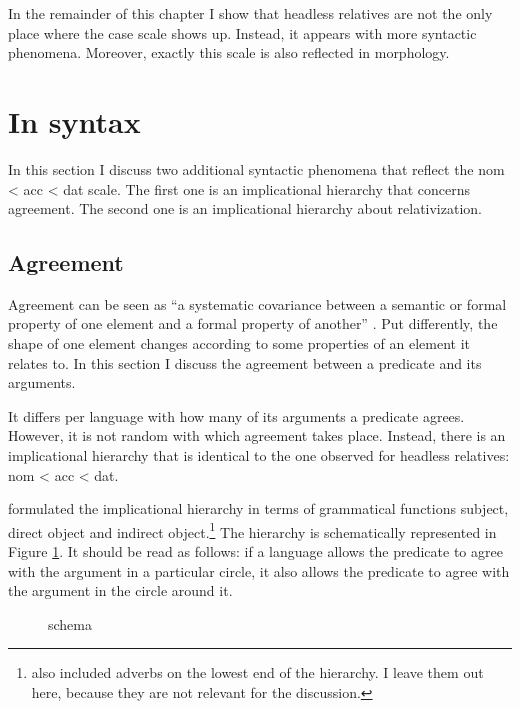 In the remainder of this chapter I show that headless relatives are not the only place where the case scale shows up. Instead, it appears with more syntactic phenomena. Moreover, exactly this scale is also reflected in morphology.


\section{In syntax}\label{sec:impl-hier}

In this section I discuss two additional syntactic phenomena that reflect the \ac{nom} < \ac{acc} < \ac{dat} scale. The first one is an implicational hierarchy that concerns agreement. The second one is an implicational hierarchy about relativization.


\subsection{Agreement}

Agreement can be seen as ``a systematic covariance between a semantic or formal property of one element and a formal property of another'' \citep{steel1978}. Put differently, the shape of one element changes according to some properties of an element it relates to. In this section I discuss the agreement between a predicate and its arguments.

It differs per language with how many of its arguments a predicate agrees. However, it is not random with which agreement takes place. Instead, there is an implicational hierarchy that is identical to the one observed for headless relatives: \ac{nom} < \ac{acc} < \ac{dat}.

\citet{moravcsik1978} formulated the implicational hierarchy in terms of grammatical functions subject, direct object and indirect object.\footnote{
\citet{moravcsik1978} also included adverbs on the lowest end of the hierarchy. I leave them out here, because they are not relevant for the discussion.
}
The hierarchy is schematically represented in Figure \ref{fig:agr-sub-do-io}. It should be read as follows: if a language allows the predicate to agree with the argument in a particular circle, it also allows the predicate to agree with the argument in the circle around it.

\begin{figure}[ht]
  \centering
  \caption{ schema}
  \label{fig:agr-sub-do-io}
\end{figure}

